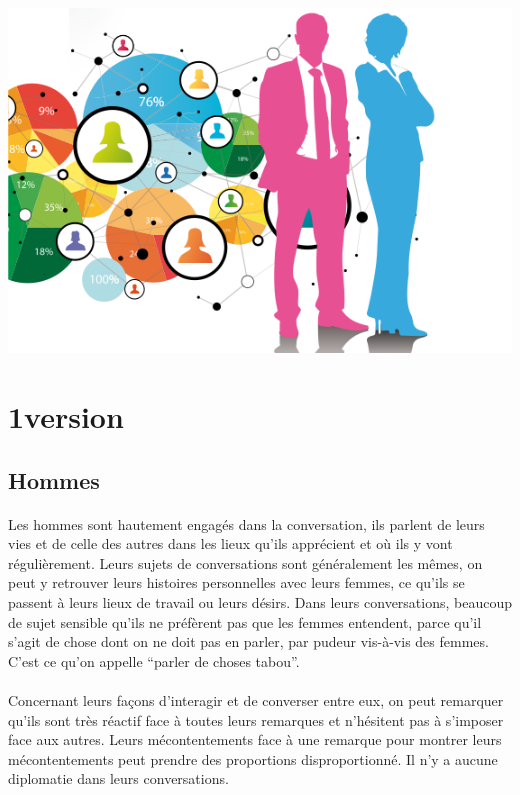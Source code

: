 \begin{center}
	\includegraphics[scale=0.7]{h-f.png}
\end{center}

\section{1\iere version}

\subsection{Hommes}

\paragraph{} Les hommes sont hautement engagés dans la conversation, ils
parlent de leurs vies et de celle des autres dans les lieux qu'ils apprécient
et où ils y vont régulièrement. Leurs sujets de conversations sont généralement
les mêmes, on peut y retrouver leurs histoires personnelles avec leurs femmes,
ce qu'ils se passent à leurs lieux de travail ou leurs désirs. Dans leurs
conversations, beaucoup de sujet sensible qu'ils ne préfèrent pas que les
femmes entendent, parce qu'il s'agit de chose dont on ne doit pas en parler,
par pudeur vis-à-vis des femmes. C'est ce qu'on appelle ``parler de choses
tabou''.

\paragraph{} Concernant leurs façons d'interagir et de converser entre eux, on
peut remarquer qu'ils sont très réactif face à toutes leurs remarques et
n'hésitent pas à s'imposer face aux autres. Leurs mécontentements face à une
remarque pour montrer leurs mécontentements peut prendre des proportions
disproportionné. Il n'y a aucune diplomatie dans leurs conversations.

